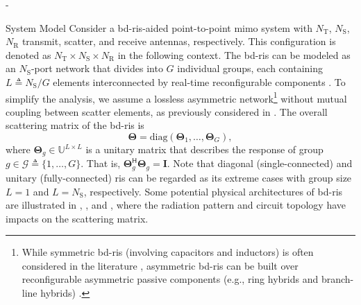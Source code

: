 \begin{section}{-}
	\begin{subsection}{System Model}
		Consider a \gls{bd}-\gls{ris}-aided point-to-point \gls{mimo} system with $N_\mathrm{T}$, $N_\mathrm{S}$, $N_\mathrm{R}$ transmit, scatter, and receive antennas, respectively.
		This configuration is denoted as $N_\mathrm{T} \times N_\mathrm{S} \times N_\mathrm{R}$ in the following context.
		The \gls{bd}-\gls{ris} can be modeled as an $N_\mathrm{S}$-port network \cite{Ivrlac2010} that divides into $G$ individual groups, each containing $L \triangleq N_\mathrm{S} / G$ elements interconnected by real-time reconfigurable components \cite{Shen2020a}.
		To simplify the analysis, we assume a lossless asymmetric network\footnote{While symmetric \gls{bd}-\gls{ris} (involving capacitors and inductors) is often considered in the literature \cite{Shen2020a,Nerini2023,Santamaria2023,Fang2023,Nerini2024,Zhou2023,Li2023d,Bartoli2023}, asymmetric \gls{bd}-\gls{ris} can be built over reconfigurable asymmetric passive components (e.g., ring hybrids and branch-line hybrids) \cite{Ahn2006}.} without mutual coupling between scatter elements, as previously considered in \cite{Li2023b,Li2023c,Bartoli2023}.
		The overall scattering matrix of the \gls{bd}-\gls{ris} is
		\begin{equation}
			\mathbf{\Theta} = \mathrm{diag}(\mathbf{\Theta}_1,\ldots,\mathbf{\Theta}_G),
		\end{equation}
		where $\mathbf{\Theta}_g \in \mathbb{U}^{L \times L}$ is a unitary matrix that describes the response of group $g \in \mathcal{G} \triangleq \{1, \ldots, G\}$.
		That is, $\mathbf{\Theta}_g^\mathsf{H} \mathbf{\Theta}_g = \mathbf{I}$.
		Note that diagonal (single-connected) and unitary (fully-connected) \gls{ris} can be regarded as its extreme cases with group size $L=1$ and $L=N_\mathrm{S}$, respectively.
		Some potential physical architectures of \gls{bd}-\gls{ris} are illustrated in \cite[Fig. 3]{Shen2020a}, \cite[Fig. 5]{Li2023c}, and \cite[Fig. 2]{Nerini2024}, where the radiation pattern and circuit topology have impacts on the scattering matrix.


\end{subsection}
\end{section}
